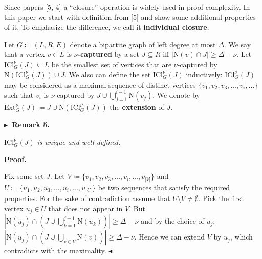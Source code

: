 \documentclass[10pt,a4paper]{article}
\begin{document}
Since papers [5, 4] a “closure” operation is widely used in proof complexity. In this
paper we start with definition from [5] and show some additional properties of it. To emphasize the
difference, we call it \textbf{individual closure}.\par




Let $G\coloneqq(L,R,E)$ denote a bipartite graph of left degree at most $\Delta$. We say that a
vertex $v\in L$ is $\nu$\textbf{-captured} by a set $J\subseteq R$ iff $|\mathrm{N}\left(v\right)\cap J|\geq\Delta-\nu$. Let $\mathrm{ICl}_{G}^{\nu}\left(J\right)\subseteq L$ be the smallest set of vertices that are $\nu$-captured
by $\mathrm{N}\left(\mathrm{ICl}_{G}^{\nu}\left(J\right)\right)\cup J$. We also can define the set $\mathrm{ICl}_{G}^{\nu}\left(J\right)$ inductively:
$\mathrm{ICl}_{G}^{\nu}\left(J\right)$ may be considered as a maximal sequence of distinct vertices $\{v_{1},v_{2},v_{3},\dots,v_{i},\dots\}$ such that $v_{i}$ is $\nu$-captured by $J\cup\bigcup\limits_{j=1}^{i-1}\mathrm{N}\left(v_{j}\right)$. We
denote by $\mathrm{Ext}_{G}^{\nu}\left(J\right)\coloneqq J\cup\mathrm{N}\left(\mathrm{ICl%
}_{G}^{\nu}\left(J\right)\right)$ the \textbf{extension} of $J$.\par





\par\medskip\noindent\textbf{
$\blacktriangleright$ Remark 5.
}\par



$\mathrm{ICl}_{G}^{\nu}\left(J\right)$\emph{ is unique and well-defined.}\par







\par\medskip\noindent\textbf{Proof.}\par




Fix some set $J$. Let $V\coloneqq\{v_{1},v_{2},v_{3},\dots,v_{i},\dots,v_{|V|}\}$ and $U\coloneqq\{u_{1},u_{2},u_{3},\dots,u_{i},\dots,u_{|U|}\}$ be two sequences that satisfy the required properties. For the sake of
contradiction assume that $U\setminus V\neq\emptyset$. Pick the first vertex $u_{j}\in U$ that does
not appear in $V$. But $|\mathrm{N}\left(u_{j}\right)\cap(J\cup\bigcup\limits_{k=1}^{j-1}\mathrm{N}%
\left(u_{k}\right))|\geq\Delta-\nu$ and by the choice of $u_{j}$: $|\mathrm{N}\left(u_{j}\right)\cap(J\cup\bigcup\limits_{v\in V}\mathrm{N}\left(%
v\right))|\geq\Delta-\nu$. Hence we can extend $V$ by $u_{j}$, which contradicts with the maximality.
$\blacktriangleleft$\par
\end{document}
